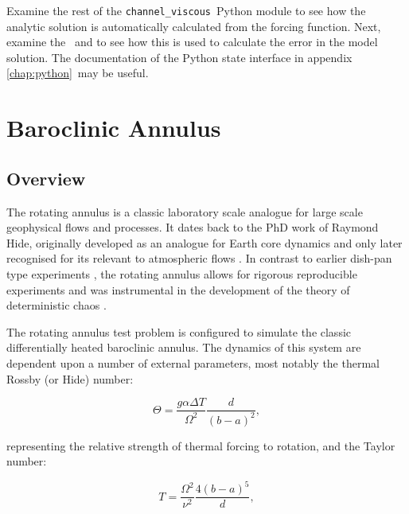 Examine the rest of the \lstinline[language=python]{channel_viscous}\ Python
module to see how the analytic solution is automatically calculated from the
forcing function. Next, examine the \
and  to see how this is used to
calculate the error in the model solution. The documentation of the Python
state interface in appendix \ref{chap:python}\ may be useful.


\section{Baroclinic Annulus}
\label{sect:annulus}

\subsection{Overview}

The rotating annulus is a classic laboratory scale analogue for large scale
geophysical flows and processes. It dates back to the PhD work of Raymond Hide,
originally developed as an analogue for Earth core dynamics \citep{hide1952} and only
later recognised for its relevant to atmospheric flows \citep{hide1953, hide2006}.
In contrast to earlier dish-pan type experiments \citep{fultz1951}, the rotating
annulus allows for rigorous reproducible experiments and was instrumental in the
development of the theory of deterministic chaos \citep{lorenz1963}.

The rotating annulus test problem is configured to simulate the classic
differentially heated baroclinic annulus. The dynamics
of this system are dependent upon a number of external parameters, most notably
the thermal Rossby (or Hide) number:

\begin{equation}\label{eqn:hide_number}
  \Theta = \frac{g \alpha \Delta T}{\Omega^2} \frac{d}{(b - a)^2},
\end{equation}

representing the relative strength of thermal forcing to rotation, and the Taylor number:

\begin{equation}\label{eqn:taylor_number}
  T = \frac{\Omega^2}{\nu^2} \frac{4(b - a)^5}{d},
\end{equation}

